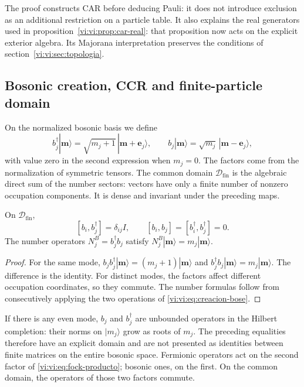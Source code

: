 The proof constructs CAR before deducing Pauli: it does not introduce
exclusion as an additional restriction on a particle table.
It also explains the real generators used in
proposition~\ref{vi:vi:prop:car-real}: that proposition now acts
on the explicit exterior algebra. Its Majorana interpretation
preserves the conditions of section~\ref{vi:vi:sec:topologia}.

\subsection{Bosonic creation, CCR and finite-particle domain}
\label{vi:vi:subsec:ccr-construccion}

On the normalized bosonic basis we define
\begin{equation}
 b_j^\dagger|\boldsymbol m\rangle=
 \sqrt{m_j+1}\,|\boldsymbol m+\boldsymbol e_j\rangle,
 \qquad
 b_j|\boldsymbol m\rangle=
 \sqrt{m_j}\,|\boldsymbol m-\boldsymbol e_j\rangle,
 \label{vi:vi:eq:creacion-bose}
\end{equation}
with value zero in the second expression when \(m_j=0\).
The factors come from the normalization of symmetric tensors.
The common domain \(\mathcal D_{\mathrm{fin}}\) is the algebraic direct
sum of the number sectors: vectors have only a
finite number of nonzero occupation components. It is dense and
invariant under the preceding maps.

\begin{theorem}
\label{vi:vi:thm:ccr-construidas}
On \(\mathcal D_{\mathrm{fin}}\),
\[
 [b_i,b_j^\dagger]=\delta_{ij}I,\qquad
 [b_i,b_j]=[b_i^\dagger,b_j^\dagger]=0.
\]
The number operators \(N_j^B=b_j^\dagger b_j\) satisfy
\(N_j^B|\boldsymbol m\rangle=m_j|\boldsymbol m\rangle\).
\end{theorem}
\begin{proof}
For the same mode,
\(b_jb_j^\dagger|\boldsymbol m\rangle=(m_j+1)|\boldsymbol m\rangle\)
and \(b_j^\dagger b_j|\boldsymbol m\rangle=m_j|\boldsymbol m\rangle\).
The difference is the identity. For distinct modes, the factors
affect different occupation coordinates, so they commute.
The number formulas follow from consecutively applying the two
operations of \eqref{vi:vi:eq:creacion-bose}.
\end{proof}

If there is any even mode, \(b_j\) and \(b_j^\dagger\) are unbounded
operators in the Hilbert completion: their norms on
\(|m_j\rangle\) grow as roots of \(m_j\). The preceding
equalities therefore have an explicit domain and are not presented
as identities between finite matrices on the entire bosonic space.
Fermionic operators act on the second factor of
\eqref{vi:vi:eq:fock-producto}; bosonic ones, on the first. On
the common domain, the operators of those two factors commute.

